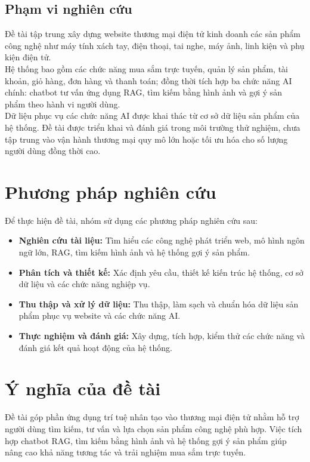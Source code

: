 \documentclass{report}
\begin{document}
\subsection{Phạm vi nghiên cứu}
Đề tài tập trung xây dựng website thương mại điện tử kinh doanh các sản phẩm công nghệ như máy tính xách tay, điện thoại, 
tai nghe, máy ảnh, linh kiện và phụ kiện điện tử.\\

Hệ thống bao gồm các chức năng mua sắm trực tuyến, quản lý sản phẩm, tài khoản, giỏ hàng, đơn hàng và thanh toán; đồng thời 
tích hợp ba chức năng AI chính: chatbot tư vấn ứng dụng RAG, tìm kiếm bằng hình ảnh và gợi ý sản phẩm theo hành vi người 
dùng.\\

Dữ liệu phục vụ các chức năng AI được khai thác từ cơ sở dữ liệu sản phẩm của hệ thống. Đề tài được triển khai và đánh giá 
trong môi trường thử nghiệm, chưa tập trung vào vận hành thương mại quy mô lớn hoặc tối ưu hóa cho số lượng người dùng đồng 
thời cao.

\section{Phương pháp nghiên cứu}
Để thực hiện đề tài, nhóm sử dụng các phương pháp nghiên cứu sau:

\begin{itemize}
    \item \textbf{Nghiên cứu tài liệu:} Tìm hiểu các công nghệ phát triển web, mô hình ngôn ngữ lớn, RAG, tìm kiếm hình ảnh và hệ 
    thống gợi ý sản phẩm.
    \item \textbf{Phân tích và thiết kế:} Xác định yêu cầu, thiết kế kiến trúc hệ thống, cơ sở dữ liệu và các chức năng nghiệp vụ.
    \item \textbf{Thu thập và xử lý dữ liệu:} Thu thập, làm sạch và chuẩn hóa dữ liệu sản phẩm phục vụ website và các chức năng AI.
    \item \textbf{Thực nghiệm và đánh giá:} Xây dựng, tích hợp, kiểm thử các chức năng và đánh giá kết quả hoạt động của hệ thống.
\end{itemize}

\section{Ý nghĩa của đề tài}
Đề tài góp phần ứng dụng trí tuệ nhân tạo vào thương mại điện tử nhằm hỗ trợ người dùng tìm kiếm, tư vấn và lựa chọn sản phẩm công 
nghệ phù hợp. Việc tích hợp chatbot RAG, tìm kiếm bằng hình ảnh và hệ thống gợi ý sản phẩm giúp nâng cao khả năng tương tác và trải 
nghiệm mua sắm trực tuyến.\\
\end{document}
